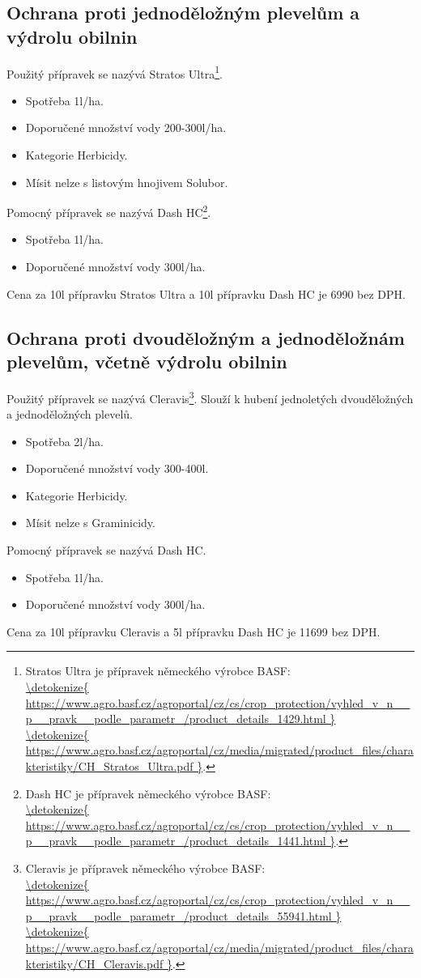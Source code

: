 \subsection{Ochrana proti jednoděložným plevelům a výdrolu obilnin}
Použitý přípravek se nazývá Stratos Ultra\footnote{Stratos Ultra je přípravek německého výrobce BASF: \\\url{\detokenize{
https://www.agro.basf.cz/agroportal/cz/cs/crop_protection/vyhled_v_n__p__pravk__podle_parametr_/product_details_1429.html
}}
\\\url{\detokenize{
https://www.agro.basf.cz/agroportal/cz/media/migrated/product_files/charakteristiky/CH_Stratos_Ultra.pdf
}}.}.
\begin{itemize}
  \item Spotřeba 1l/ha.
  \item Doporučené množství vody 200-300l/ha.
  \item Kategorie Herbicidy.
  \item Mísit nelze s listovým hnojivem Solubor.
\end{itemize}
Pomocný přípravek se nazývá Dash HC\footnote{Dash HC je přípravek německého výrobce BASF: \\\url{\detokenize{
https://www.agro.basf.cz/agroportal/cz/cs/crop_protection/vyhled_v_n__p__pravk__podle_parametr_/product_details_1441.html
}}.}.
\begin{itemize}
  \item Spotřeba 1l/ha.
  \item Doporučené množství vody 300l/ha.
\end{itemize}
Cena za 10l přípravku Stratos Ultra a 10l přípravku Dash HC je 6990 bez DPH.

\subsection{Ochrana proti dvouděložným a jednoděložnám plevelům, včetně výdrolu obilnin}
Použitý přípravek se nazývá Cleravis\footnote{Cleravis je přípravek německého výrobce BASF: \\\url{\detokenize{
https://www.agro.basf.cz/agroportal/cz/cs/crop_protection/vyhled_v_n__p__pravk__podle_parametr_/product_details_55941.html
}}
\\\url{\detokenize{
https://www.agro.basf.cz/agroportal/cz/media/migrated/product_files/charakteristiky/CH_Cleravis.pdf
}}.}.
Slouží k hubení jednoletých dvouděložných a jednoděložných plevelů.
\begin{itemize}
  \item Spotřeba 2l/ha.
  \item Doporučené množství vody 300-400l.
  \item Kategorie Herbicidy.
  \item Mísit nelze s Graminicidy.
\end{itemize}
Pomocný přípravek se nazývá Dash HC.
\begin{itemize}
  \item Spotřeba 1l/ha.
  \item Doporučené množství vody 300l/ha.
\end{itemize}
Cena za 10l přípravku Cleravis a 5l přípravku Dash HC je 11699 bez DPH.
